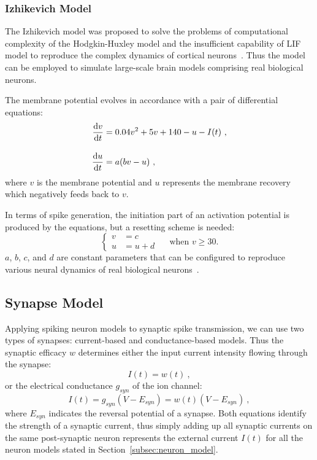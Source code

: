 \subsubsection{Izhikevich Model}
The Izhikevich model was proposed to solve the problems of computational complexity of the Hodgkin-Huxley model and the insufficient capability of LIF model to reproduce the complex dynamics of cortical neurons~\citep{izhikevich2003simple}.
Thus the model can be employed to simulate large-scale brain models comprising real biological neurons.

The membrane potential evolves in accordance with a pair of differential equations:
\begin{equation}
\begin{aligned}
\dfrac{\mathrm{d} v}{\mathrm{d} t} &= 0.04v^2 + 5v + 140 - u - I(t)~,\\[10pt]
\dfrac{\mathrm{d} u}{\mathrm{d} t} &= a(bv - u)~,
\end{aligned}
\end{equation}
where $v$ is the membrane potential and $u$ represents the membrane recovery which negatively feeds back to $v$.

In terms of spike generation, the initiation part of an activation potential is produced by the equations, but a resetting scheme is needed:
\begin{equation}
\left\{
\begin{aligned}
v &= c \\
u &= u + d
\end{aligned}
\right.
\textrm{~~~~when~} v \geq 30.
\end{equation}  
$a$, $b$, $c$, and $d$ are constant parameters that can be configured to reproduce various neural dynamics of real biological neurons~\citep{izhikevich2004model}.

\subsection{Synapse Model}
Applying spiking neuron models to synaptic spike transmission, we can use two types of synapses: current-based and conductance-based models.
Thus the synaptic efficacy $w$ determines either the input current intensity flowing through the synapse: %
\begin{equation}
I(t) = w(t)~,
\end{equation}
or the electrical conductance $g_{syn}$ of the ion channel: %
\begin{equation}
I(t) = g_{syn} (V-E_{syn}) = w(t) (V-E_{syn})~,
\end{equation}
where $E_{syn}$ indicates the reversal potential of a synapse.
Both equations identify the strength of a synaptic current, thus simply adding up all synaptic currents on the same post-synaptic neuron represents the external current $I(t)$ for all the neuron models stated in Section~\ref{subsec:neuron_model}.

